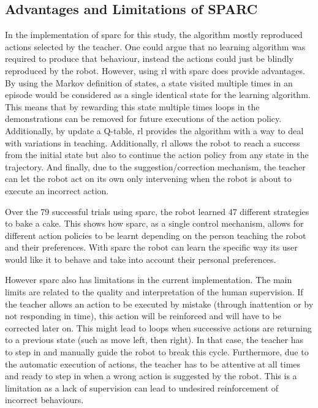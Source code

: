 \subsection{Advantages and Limitations of SPARC}

In the implementation of \gls{sparc} for this study, the algorithm mostly reproduced actions selected by the teacher. One could argue that no learning algorithm was required to produce that behaviour, instead the actions could just be blindly reproduced by the robot. However, using \gls{rl} with \gls{sparc} does provide advantages. By using the Markov definition of states, a state visited multiple times in an episode would be considered as a single identical state for the learning algorithm. This means that by rewarding this state multiple times loops in the demonstrations can be removed for future executions of the action policy. Additionally, by update a Q-table, \gls{rl} provides the algorithm with a way to deal with variations in teaching. Additionally, \gls{rl} allows the robot to reach a success from the initial state but also to continue the action policy from any state in the trajectory. And finally, due to the suggestion/correction mechanism, the teacher can let the robot act on its own only intervening when the robot is about to execute an incorrect action. 

Over the 79 successful trials using \gls{sparc}, the robot learned 47 different strategies to bake a cake. This shows how \gls{sparc}, as a single control mechanism, allows for different action policies to be learnt depending on the person teaching the robot and their preferences. With \gls{sparc} the robot can learn the specific way its user would like it to behave and take into account their personal preferences.

However \gls{sparc} also has limitations in the current implementation. The main limits are related to the quality and interpretation of the human supervision. If the teacher allows an action to be executed by mistake (through inattention or by not responding in time), this action will be reinforced and will have to be corrected later on. This might lead to loops when successive actions are returning to a previous state (such as move left, then right). In that case, the teacher has to step in and manually guide the robot to break this cycle. Furthermore, due to the automatic execution of actions, the teacher has to be attentive at all times and ready to step in when a wrong action is suggested by the robot. This is a limitation as a lack of supervision can lead to undesired reinforcement of incorrect behaviours.

